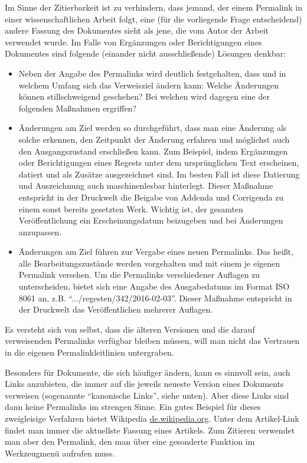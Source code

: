 \documentclass[12pt, a4paper]{article}
\begin{document}
Im Sinne der Zitierbarkeit ist zu verhindern, dass jemand, der einem
Permalink in einer wissenschaftlichen Arbeit folgt, eine (für die
vorliegende Frage entscheidend) andere Fassung des Dokumentes sieht
als jene, die vom Autor der Arbeit verwendet wurde. Im Falle von
Ergänzungen oder Berichtigungen eines Dokumentes sind folgende
(einander nicht ausschließende) Lösungen denkbar:

\begin{itemize}
\item Neben der Angabe des Permalinks wird deutlich festgehalten, dass
  und in welchem Umfang sich das Verweisziel ändern kann: Welche
  Änderungen können stillschweigend geschehen? Bei welchen wird
  dagegen eine der folgenden Maßnahmen ergriffen?

\item Änderungen am Ziel werden so durchgeführt, dass man eine
  Änderung als solche erkennen, den Zeitpunkt der Änderung erfahren
  und möglichst auch den Ausgangszustand erschließen kann. Zum
  Beispiel, indem Ergänzungen oder Berichtigungen eines Regests unter
  dem ursprünglichen Text erscheinen, datiert und als Zusätze
  ausgezeichnet sind. Im besten Fall ist diese Datierung und Auszeichnung
  auch maschinenlesbar hinterlegt. Dieser Maßnahme entspricht in der
  Druckwelt die Beigabe von Addenda und Corrigenda zu einem sonst
  bereits gesetzten Werk. Wichtig ist, der gesamten Veröffentlichung
  ein Erscheinungsdatum beizugeben und bei Änderungen anzupassen.

\item Änderungen am Ziel führen zur Vergabe eines neuen
  Permalinks. Das heißt, alle Bearbeitungszustände werden vorgehalten
  und mit einem je eigenen Permalink versehen. Um die Permalinks
  verschiedener Auflagen zu unterscheiden, bietet sich eine Angabe des
  Ausgabedatums im Format ISO 8061 an,
  z.B. "`.../regesten/342/2016-02-03"'. Dieser Maßnahme entspricht in
  der Druckwelt das Veröffentlichen mehrerer Auflagen.
\end{itemize}

Es versteht sich von selbst, dass die älteren Versionen und die darauf
verweisenden Permalinks verfügbar bleiben müssen, will man nicht das
Vertrauen in die eigenen Permalinkleitlinien untergraben.

Besonders für Dokumente, die sich häufiger ändern, kann es sinnvoll
sein, auch Links anzubieten, die immer auf die jeweils neueste Version
eines Dokuments verweisen (sogenannte "`kanonische Links"', siehe
unten).  Aber diese Links sind dann keine Permalinks im strengen
Sinne. Ein gutes Beispiel für dieses zweigleisige Verfahren bietet
Wikipedia \href{https://de.wikipedia.org/}{de.\-wikipedia.\-org}.  Unter
dem Artikel-Link findet man immer die aktuellste Fassung eines
Artikels. Zum Zitieren verwendet man aber den Permalink, den man über
eine gesonderte Funktion im Werkzeugmenü aufrufen muss.
\end{document}
